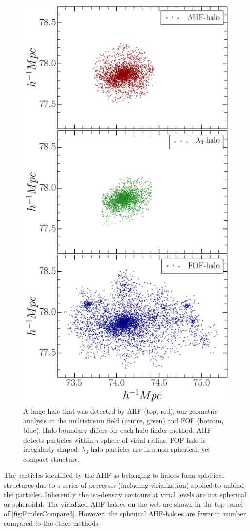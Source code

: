 \begin{figure}
\begin{minipage}[t]{.99\linewidth}
 \centering
 \includegraphics[width=10.cm]{Chapter5/Source_v2/fig11.pdf}
\end{minipage}\hfill
\caption{A large halo that was detected by AHF (top, red), our geometric analysis in the multistream field (centre, green) and FOF (bottom, blue). Halo boundary differs for each halo finder method. AHF detects particles within a sphere of virial radius. FOF-halo is irregularly shaped. $\lambda_3$-halo particles are in a non-spherical, yet compact structure. }
\label{fig:FinderCompareAll}
\end{figure}



The particles identified by the AHF as belonging to haloes form spherical structures due to a series of processes (including virialization) applied to unbind the particles. Inherently, the iso-density contours at virial levels are not spherical or spheroidal. The virialized AHF-haloes on the web are shown in the top panel of \autoref{fig:FinderCompare3}. However, the spherical AHF-haloes are fewer in number compared to the other methods. 

